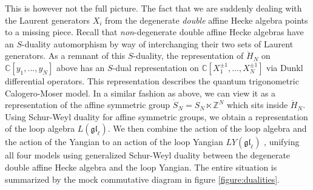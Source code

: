 \documentclass[11pt]{report}
\theoremstyle{definition}
\theoremstyle{remark}
\theoremstyle{remark}
\newcommand{\Z}{\mathbb{Z}}
\newcommand{\C}{\mathbb{C}}
\begin{document}
This is however not the full picture. The fact that we are suddenly dealing with the Laurent generators $X_i$ from the degenerate \emph{double} affine Hecke algebra points to a missing piece. Recall that \emph{non}-degenerate double affine Hecke algebras have an $S$-duality automorphism by way of interchanging their two sets of Laurent generators. As a remnant of this $S$-duality, the representation of $\ddot H_N$ on $\C[y_1,...,y_N]$ above has an $S$-dual representation on $\C[X_1^{\pm 1},...,X_N^{\pm 1}]$ via Dunkl differential operators. This representation describes the quantum trigonometric Calogero-Moser model. In a similar fashion as above, we can view it as a representation of the affine symmetric group $\dot S_N = S_N \ltimes \Z^N$ which sits inside $\ddot H_N$. Using Schur-Weyl duality for affine symmetric groups, we obtain a representation of the loop algebra $L(\mathfrak{gl}_\ell)$. We then combine the action of the loop algebra and the action of the Yangian to an action of the loop Yangian $LY(\mathfrak{gl}_\ell)$ \cite{article:guay:2005}, unifying all four models using generalized Schur-Weyl duality between the degenerate double affine Hecke algebra and the loop Yangian. The entire situation is summarized by the mock commutative diagram in figure \ref{figure:dualities}.
\end{document}
